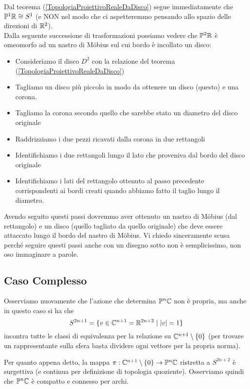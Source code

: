 \begin{multicols*}{2}
\begin{remark}
Dal teorema (\ref{TopologiaProiettivoRealeDaDisco}) segue immediatamente che $\mathbb{P}^1\mathbb{R}\cong S^1$ (e NON nel modo che ci aspetteremmo pensando allo spazio delle direzioni di $\mathbb{R}^2$).\\
Dalla seguente successione di trasformazioni possiamo vedere che $\mathbb{P}^2\mathbb{R}$ \`e omeomorfo ad un nastro di M\"obius sul cui bordo \`e incollato un disco:
\begin{itemize}[noitemsep]
\item Consideriamo il disco $D^2$ con la relazione del teorema (\ref{TopologiaProiettivoRealeDaDisco})
\item Tagliamo un disco pi\`u piccolo in modo da ottenere un disco (questo) e una corona.
\item Tagliamo la corona secondo quello che sarebbe stato un diametro del disco originale
\item Raddrizziamo i due pezzi ricavati dalla corona in due rettangoli
\item Identifichiamo i due rettangoli lungo il lato che proveniva dal bordo del disco originale
\item Identifichiamo i lati del rettangolo ottenuto al passo precedente corrispondenti ai bordi creati quando abbiamo fatto il taglio lungo il diametro.
\end{itemize}
Avendo seguito questi passi dovremmo aver ottenuto un nastro di M\"obius (dal rettangolo) e un disco (quello tagliato da quello originale) che deve essere attaccato lungo il bordo del nastro di M\"obius. Vi chiedo sinceramente scusa perch\'e seguire questi passi anche con un disegno sotto non \`e semplicissimo, non oso immaginare a parole.
\end{remark}

\subsection{Caso Complesso}
Osserviamo nuovamente che l'azione che determina $\mathbb{P}^n\mathbb{C}$ non \`e propria, ma anche in questo caso si ha che
\[S^{2n+1}=\{v\in\mathbb{C}^{n+1}=\mathbb{R}^{2n+2}\mid |v|=1\}\]
incontra tutte le classi di equivalenza per la relazione su $\mathbb{C}^{n+1}\setminus\{0\}$ (per trovare un rappresentante sulla sfera basta dividere ogni vettore per la propria norma).

\begin{remark}
Per quanto appena detto, la mappa $\pi:\mathbb{C}^{n+1}\setminus\{0\}\to\mathbb{P}^n\mathbb{C}$ ristretta a $S^{2n+2}$ \`e surgettiva (e continua per definizione di topologia quoziente). Osserviamo quindi che $\mathbb{P}^n\mathbb{C}$ \`e compatto e connesso per archi.
\end{remark}


\end{multicols*}
